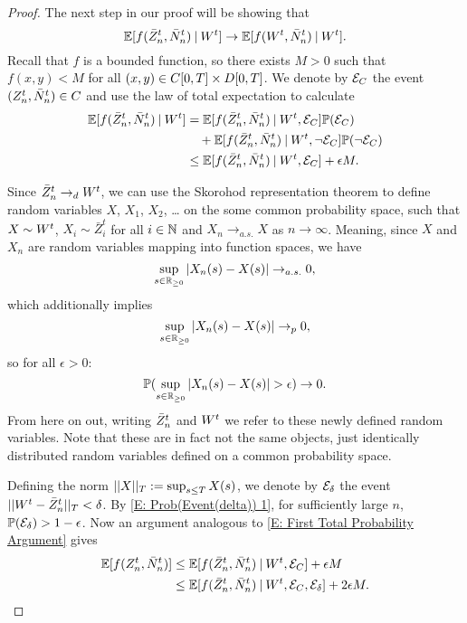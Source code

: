 \begin{proof}
The next step in our proof will be showing that
\begin{equation}
\mathbb{E}[ f(\bar{Z}^t_n, \bar{N}_n^t) \: | \: W^t] \rightarrow \mathbb{E}[f(W^t, \bar{N}_n^t) \: | \: W^t].
\end{equation}
Recall that $f$ is a bounded function, so there exists $M>0$ such that $f(x,y) < M$ for all $(x,y) \in C[0, T] \times D[0, T]$.
We denote by $\mathcal{E}_{C}$ the event $(Z_n^t, \bar{N}_n^t) \in C$ and use the law of total expectation to calculate
\begin{equation} \label{E: Estimation step 1}
\begin{aligned}
\mathbb{E}[ f(\bar{Z}^t_n, \bar{N}_n^t) \: | \: W^t] 
&= \mathbb{E}[f(\bar{Z}^t_n, \bar{N}_n^t) \: | \: W^t, \mathcal{E}_{C}] \mathbb{P}(\mathcal{E}_{C}) \\
&\quad + \mathbb{E}[f(\bar{Z}^t_n, \bar{N}_n^t) \: | \: W^t, \neg\mathcal{E}_{C}] \mathbb{P}(\neg\mathcal{E}_{C}) \\
&\leq \mathbb{E}[f(\bar{Z}^t_n, \bar{N}_n^t) \: | \: W^t, \mathcal{E}_{C}] + \epsilon M.
\end{aligned}
\end{equation}

Since $\bar{Z}^t_n \rightarrow_d W^t$, we can use the Skorohod representation theorem to define random variables $X$, $X_1$, $X_2$, \dots
on the some common probability space, such that $X \sim W^t$, $X_i \sim \bar{Z}^t_i$ for all $i \in \mathbb{N}$
and $X_n \rightarrow_{a.s.} X$ as $n \rightarrow \infty$.
Meaning, since $X$ and $X_n$ are random variables mapping into function spaces, we have
\begin{equation}
\sup_{s \in \mathbb{R}_{\geq 0}} |X_n(s) - X(s)| \rightarrow_{a.s.} 0,
\end{equation}
which additionally implies
\begin{equation} 
\sup_{s \in \mathbb{R}_{\geq 0}} |X_n(s) - X(s)| \rightarrow_p 0,
\end{equation}
so for all $\epsilon > 0$:
\begin{equation} \label{E: Prob(Event(delta)) 1}
\mathbb{P}( \sup_{s \in \mathbb{R}_{\geq 0}} |X_n(s) - X(s)| > \epsilon ) \rightarrow 0.
\end{equation}
From here on out, writing $\bar{Z}^t_n$ and $W^t$ we refer to these newly defined random variables.
Note that these are in fact not the same objects, just identically distributed random variables defined on a common probability space.

Defining the norm $||X||_T := \sup_{s \leq T}X(s)$, we denote by $\mathcal{E}_{\delta}$ the event $||W^t - \bar{Z}^t_n||_T < \delta$.
By \eqref{E: Prob(Event(delta)) 1}, for sufficiently large $n$, $\mathbb{P}(\mathcal{E}_{\delta}) > 1 - \epsilon$.
Now an argument analogous to \eqref{E: First Total Probability Argument} gives
\begin{equation} \label{E: Estimation step 2}
\begin{aligned}
\mathbb{E}[f(Z_n^t, \bar{N}_n^t)] 
&\leq \mathbb{E}[f(\bar{Z}^t_n, \bar{N}_n^t) \: | \: W^t, \mathcal{E}_{C}] + \epsilon M \\
&\leq \mathbb{E}[f(\bar{Z}^t_n, \bar{N}_n^t) \: | \: W^t, \mathcal{E}_{C}, \mathcal{E}_{\delta}] + 2 \epsilon M.
\end{aligned}
\end{equation}


\end{proof}
